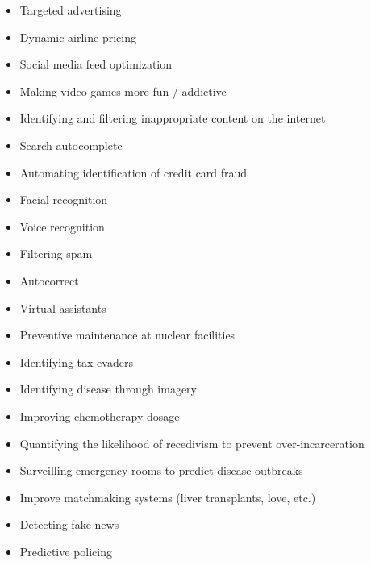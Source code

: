 \documentclass[
]{book}
\providecommand{\tightlist}{%
  \setlength{\itemsep}{0pt}\setlength{\parskip}{0pt}}
\begin{document}
\begin{itemize}
\tightlist
\item
  Targeted advertising\\
\item
  Dynamic airline pricing\\
\item
  Social media feed optimization\\
\item
  Making video games more fun / addictive\\
\item
  Identifying and filtering inappropriate content on the internet\\
\item
  Search autocomplete\\
\item
  Automating identification of credit card fraud\\
\item
  Facial recognition\\
\item
  Voice recognition\\
\item
  Filtering spam\\
\item
  Autocorrect\\
\item
  Virtual assistants\\
\item
  Preventive maintenance at nuclear facilities\\
\item
  Identifying tax evaders\\
\item
  Identifying disease through imagery\\
\item
  Improving chemotherapy dosage\\
\item
  Quantifying the likelihood of recedivism to prevent over-incarceration\\
\item
  Surveilling emergency rooms to predict disease outbreaks\\
\item
  Improve matchmaking systems (liver transplants, love, etc.)\\
\item
  Detecting fake news\\
\item
  Predictive policing
\end{itemize}
\end{document}
